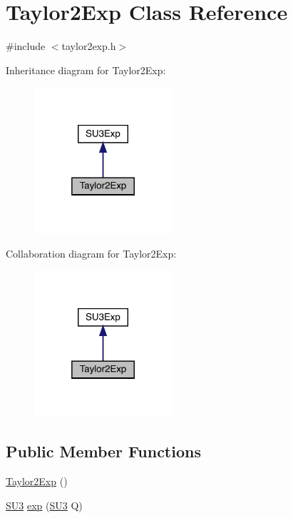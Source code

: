 \hypertarget{class_taylor2_exp}{}\section{Taylor2\+Exp Class Reference}
\label{class_taylor2_exp}


{\ttfamily \#include $<$taylor2exp.\+h$>$}



Inheritance diagram for Taylor2\+Exp\+:\nopagebreak
\begin{figure}[H]
\begin{center}
\leavevmode
\includegraphics[width=145pt]{class_taylor2_exp__inherit__graph}
\end{center}
\end{figure}


Collaboration diagram for Taylor2\+Exp\+:\nopagebreak
\begin{figure}[H]
\begin{center}
\leavevmode
\includegraphics[width=145pt]{class_taylor2_exp__coll__graph}
\end{center}
\end{figure}
\subsection*{Public Member Functions}
\begin{DoxyCompactItemize}
\item 
\mbox{\hyperlink{class_taylor2_exp_ac3b48be4c567e163f7baaa041121a93f}{Taylor2\+Exp}} ()
\item 
\mbox{\hyperlink{class_s_u3}{S\+U3}} \mbox{\hyperlink{class_taylor2_exp_af1d32ac99447c063e364ebf37ba2752e}{exp}} (\mbox{\hyperlink{class_s_u3}{S\+U3}} Q)
\end{DoxyCompactItemize}


